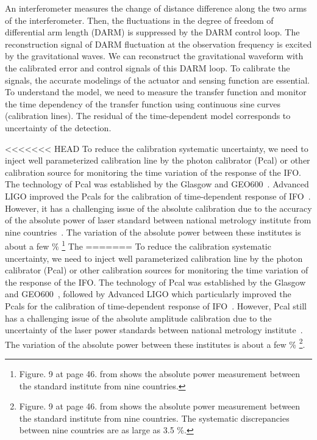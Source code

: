 \documentclass[%
 reprint,
superscriptaddress,
 amsmath,amssymb,
 aps,
]{revtex4-1}
\begin{document}

An interferometer measures the change of distance difference along the two arms of the interferometer. Then, the fluctuations in the degree of freedom of differential arm length (DARM) is suppressed by the DARM control loop. The reconstruction signal of DARM fluctuation at the observation frequency is excited by the gravitational waves. We can reconstruct the gravitational waveform with the calibrated error and control signals of this DARM loop. To calibrate the signals, the accurate modelings of the actuator and sensing function are essential. To understand the model, we need to measure the transfer function and monitor the time dependency of the transfer function using continuous sine curves (calibration lines). The residual of the time-dependent model corresponds to uncertainty of the detection.

<<<<<<< HEAD
To reduce the calibration systematic uncertainty, we need to inject well parameterized calibration line by the photon calibrator (Pcal) or other calibration source for monitoring the time variation of the response of the IFO. The technology of Pcal was established by the Glasgow and GEO600~\cite{CLUBLEY200185,MOSSAVI20061}. Advanced LIGO improved the Pcals for the calibration of time-dependent response of IFO~\cite{0264-9381-32-2-024001, doi:10.1063/1.4967303,0264-9381-27-8-084024,0264-9381-26-24-245011,0264-9381-32-2-024001}. However, it has a challenging issue of the absolute calibration due to the accuracy of the absolute power of laser standard between national metrology institute from nine countries~\cite{EUROMET}. The variation of the absolute power between these institutes is about a few \% \footnote{Figure. 9 at page 46. from \cite{EUROMET} shows the absolute power measurement between the standard institute from nine countries.} The 
=======
To reduce the calibration systematic uncertainty, we need to inject well parameterized calibration line by the photon calibrator (Pcal) or other calibration sources for monitoring the time variation of the response of the IFO. The technology of Pcal was established by the Glasgow and GEO600~\cite{CLUBLEY200185,MOSSAVI20061}, followed by Advanced LIGO which particularly improved the Pcals for the calibration of time-dependent response of IFO~\cite{0264-9381-32-2-024001, doi:10.1063/1.4967303,0264-9381-27-8-084024,0264-9381-26-24-245011,0264-9381-32-2-024001}. However, Pcal still has a challenging issue of the absolute amplitude calibration due to the uncertainty of the laser power standards between national metrology institute~\cite{EUROMET}. The variation of the absolute power between these institutes is about a few \% \footnote{Figure. 9 at page 46. from \cite{EUROMET} shows the absolute power measurement between the standard institute from nine countries. The systematic discrepancies between nine countries are as large as 3.5 \%.}.
\end{document}
